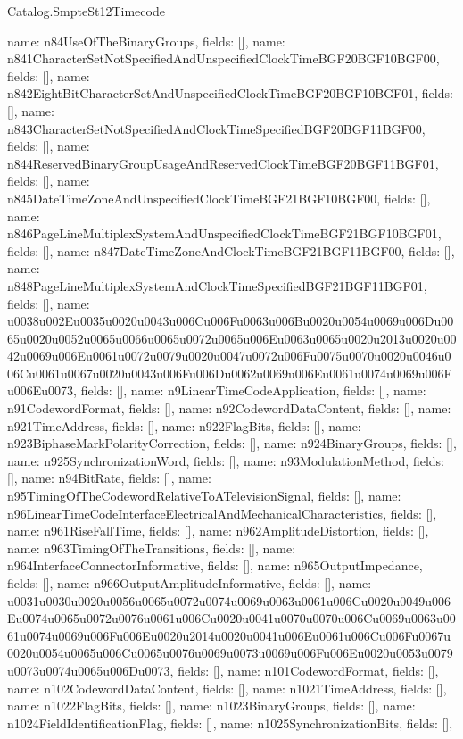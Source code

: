 \begin{lexlean}{Catalog.SmpteSt12Timecode}
\begin{semanticmodule}
{    {name: n84UseOfTheBinaryGroups, fields: []},
    {name: n841CharacterSetNotSpecifiedAndUnspecifiedClockTimeBGF20BGF10BGF00, fields: []},
    {name: n842EightBitCharacterSetAndUnspecifiedClockTimeBGF20BGF10BGF01, fields: []},
    {name: n843CharacterSetNotSpecifiedAndClockTimeSpecifiedBGF20BGF11BGF00, fields: []},
    {name: n844ReservedBinaryGroupUsageAndReservedClockTimeBGF20BGF11BGF01, fields: []},
    {name: n845DateTimeZoneAndUnspecifiedClockTimeBGF21BGF10BGF00, fields: []},
    {name: n846PageLineMultiplexSystemAndUnspecifiedClockTimeBGF21BGF10BGF01, fields: []},
    {name: n847DateTimeZoneAndClockTimeBGF21BGF11BGF00, fields: []},
    {name: n848PageLineMultiplexSystemAndClockTimeSpecifiedBGF21BGF11BGF01, fields: []},
    {name: u0038u002Eu0035u0020u0043u006Cu006Fu0063u006Bu0020u0054u0069u006Du0065u0020u0052u0065u0066u0065u0072u0065u006Eu0063u0065u0020u2013u0020u0042u0069u006Eu0061u0072u0079u0020u0047u0072u006Fu0075u0070u0020u0046u006Cu0061u0067u0020u0043u006Fu006Du0062u0069u006Eu0061u0074u0069u006Fu006Eu0073, fields: []},
    {name: n9LinearTimeCodeApplication, fields: []},
    {name: n91CodewordFormat, fields: []},
    {name: n92CodewordDataContent, fields: []},
    {name: n921TimeAddress, fields: []},
    {name: n922FlagBits, fields: []},
    {name: n923BiphaseMarkPolarityCorrection, fields: []},
    {name: n924BinaryGroups, fields: []},
    {name: n925SynchronizationWord, fields: []},
    {name: n93ModulationMethod, fields: []},
    {name: n94BitRate, fields: []},
    {name: n95TimingOfTheCodewordRelativeToATelevisionSignal, fields: []},
    {name: n96LinearTimeCodeInterfaceElectricalAndMechanicalCharacteristics, fields: []},
    {name: n961RiseFallTime, fields: []},
    {name: n962AmplitudeDistortion, fields: []},
    {name: n963TimingOfTheTransitions, fields: []},
    {name: n964InterfaceConnectorInformative, fields: []},
    {name: n965OutputImpedance, fields: []},
    {name: n966OutputAmplitudeInformative, fields: []},
    {name: u0031u0030u0020u0056u0065u0072u0074u0069u0063u0061u006Cu0020u0049u006Eu0074u0065u0072u0076u0061u006Cu0020u0041u0070u0070u006Cu0069u0063u0061u0074u0069u006Fu006Eu0020u2014u0020u0041u006Eu0061u006Cu006Fu0067u0020u0054u0065u006Cu0065u0076u0069u0073u0069u006Fu006Eu0020u0053u0079u0073u0074u0065u006Du0073, fields: []},
    {name: n101CodewordFormat, fields: []},
    {name: n102CodewordDataContent, fields: []},
    {name: n1021TimeAddress, fields: []},
    {name: n1022FlagBits, fields: []},
    {name: n1023BinaryGroups, fields: []},
    {name: n1024FieldIdentificationFlag, fields: []},
    {name: n1025SynchronizationBits, fields: []},
}
\end{semanticmodule}
\end{lexlean}

